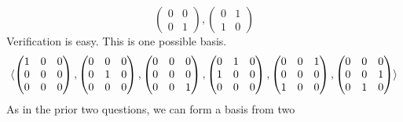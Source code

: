 \begin{exercises}
\begin{answer}
\begin{exparts}
\begin{equation*}
{\begin{pmatrix}
                0  &0  \\
                0  &1
              \end{pmatrix},
              \begin{pmatrix}
                0  &1  \\
                1  &0
              \end{pmatrix}  }
          \end{equation*}
          Verification is easy.
        \partsitem This is one possible basis.
          \begin{equation*}
            \langle
              \begin{pmatrix}
                1  &0  &0  \\
                0  &0  &0  \\
                0  &0  &0
              \end{pmatrix},
              \begin{pmatrix}
                0  &0  &0  \\
                0  &1  &0  \\
                0  &0  &0
              \end{pmatrix},
              \begin{pmatrix}
                0  &0  &0  \\
                0  &0  &0  \\
                0  &0  &1
              \end{pmatrix},
              \begin{pmatrix}
                0  &1  &0  \\
                1  &0  &0  \\
                0  &0  &0
              \end{pmatrix},
              \begin{pmatrix}
                0  &0  &1  \\
                0  &0  &0  \\
                1  &0  &0
              \end{pmatrix},
              \begin{pmatrix}
                0  &0  &0  \\
                0  &0  &1  \\
                0  &1  &0
              \end{pmatrix}  \rangle
          \end{equation*}
         \partsitem As in the prior two questions, we can form a basis from two

\end{exparts}
\end{answer}
\end{exercises}
